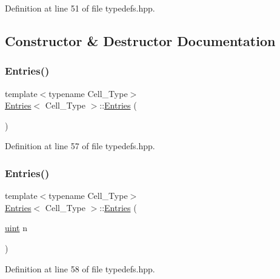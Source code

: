 Definition at line 51 of file typedefs.\+hpp.



\subsection{Constructor \& Destructor Documentation}
\mbox{\label{class_entries_a9e6cba5965f285beb3c0356c79f592d2}} 
\subsubsection{\texorpdfstring{Entries()}{Entries()}\hspace{0.1cm}{\footnotesize\ttfamily [1/2]}}
{\footnotesize\ttfamily template$<$typename Cell\+\_\+\+Type$>$ \\
\hyperlink{class_entries}{Entries}$<$ Cell\+\_\+\+Type $>$\+::\hyperlink{class_entries}{Entries} (\begin{DoxyParamCaption}{ }\end{DoxyParamCaption})\hspace{0.3cm}{\ttfamily [inline]}}



Definition at line 57 of file typedefs.\+hpp.

\mbox{\label{class_entries_a03249234a765e3363ae89dba76b3ff9f}} 
\subsubsection{\texorpdfstring{Entries()}{Entries()}\hspace{0.1cm}{\footnotesize\ttfamily [2/2]}}
{\footnotesize\ttfamily template$<$typename Cell\+\_\+\+Type$>$ \\
\hyperlink{class_entries}{Entries}$<$ Cell\+\_\+\+Type $>$\+::\hyperlink{class_entries}{Entries} (\begin{DoxyParamCaption}\item[{\hyperlink{typedefs_8hpp_a91ad9478d81a7aaf2593e8d9c3d06a14}{uint}}]{n }\end{DoxyParamCaption})\hspace{0.3cm}{\ttfamily [inline]}}



Definition at line 58 of file typedefs.\+hpp.

